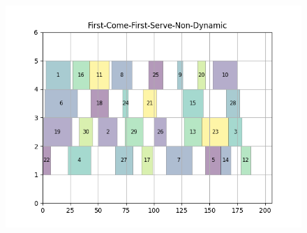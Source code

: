 \documentclass[a4paper]{article}
\begin{document}
\begin{figure}[ht] 
  \label{ fig7} 
  \begin{minipage}[b]{0.5\linewidth}
    \centering
    \includegraphics[width=1.11\linewidth]{MBSS/plot/Gantt_charts/First-Come-First-Serve-Non-Dynamic.png} 
    \caption{} 
    \vspace{4ex}
  \end{minipage}%
\end{figure}

\end{document}
